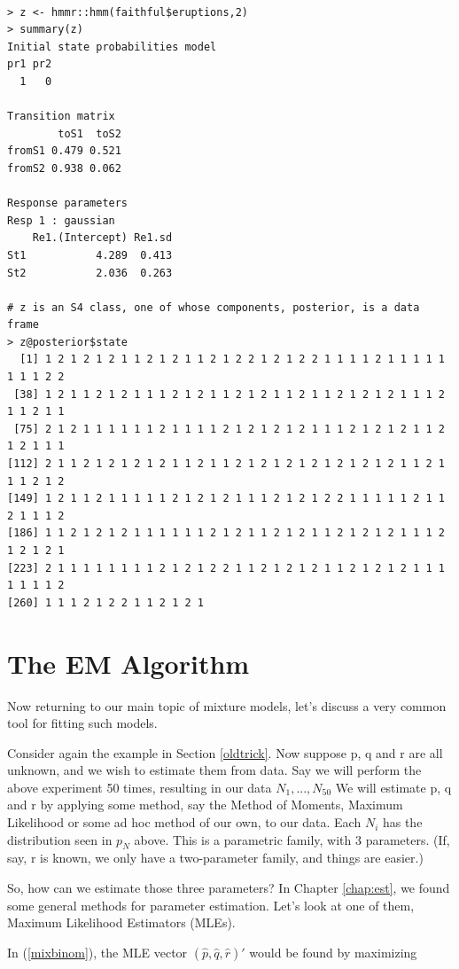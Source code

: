 \documentclass[11pt]{article}
\begin{document}
\begin{lstlisting}

> z <- hmmr::hmm(faithful$eruptions,2)
> summary(z)
Initial state probabilities model 
pr1 pr2 
  1   0 

Transition matrix 
        toS1  toS2
fromS1 0.479 0.521
fromS2 0.938 0.062

Response parameters 
Resp 1 : gaussian 
    Re1.(Intercept) Re1.sd
St1           4.289  0.413
St2           2.036  0.263

# z is an S4 class, one of whose components, posterior, is a data frame
> z@posterior$state
  [1] 1 2 1 2 1 2 1 1 2 1 2 1 1 2 1 2 2 1 2 1 2 2 1 1 1 1 2 1 1 1 1 1 1 1 1 2 2
 [38] 1 2 1 1 2 1 2 1 1 1 2 1 2 1 1 2 1 2 1 1 2 1 1 2 1 2 1 2 1 1 1 2 1 1 2 1 1
 [75] 2 1 2 1 1 1 1 1 1 2 1 1 1 1 2 1 2 1 2 1 2 1 1 1 2 1 2 1 2 1 1 2 1 2 1 1 1
[112] 2 1 1 2 1 2 1 2 1 2 1 1 2 1 1 2 1 2 1 2 1 2 1 2 1 2 1 2 1 1 2 1 1 1 2 1 2
[149] 1 2 1 1 2 1 1 1 1 1 2 1 2 1 2 1 1 1 2 1 2 1 2 2 1 1 1 1 1 2 1 1 2 1 1 1 2
[186] 1 1 2 1 2 1 2 1 1 1 1 1 1 2 1 2 1 1 2 1 2 1 1 2 1 2 1 2 1 1 1 2 1 2 1 2 1
[223] 2 1 1 1 1 1 1 1 1 2 1 2 1 2 2 1 1 2 1 2 1 2 1 1 2 1 2 1 2 1 1 1 1 1 1 1 2
[260] 1 1 1 2 1 2 2 1 1 2 1 2 1

\end{lstlisting}

\section{The EM Algorithm} 
\label{emalg}

Now returning to our main topic of mixture models, let's discuss a very
common tool for fitting such models.

Consider again the example in Section \ref{oldtrick}.  Now suppose p, q
and r are all unknown, and we wish to estimate them from data. Say we
will perform the above experiment 50 times, resulting in our data
$N_1,...,N_{50}$ We will estimate p, q and r by applying some method,
say the Method of Moments, Maximum Likelihood or some ad hoc method of
our own, to our data. Each $N_i$ has the distribution seen in $p_N$
above. This is a parametric family, with 3 parameters. (If, say, r is
known, we only have a two-parameter family, and things are easier.)

So, how can we estimate those three parameters?  In Chapter
\ref{chap:est}, we found some general methods for parameter estimation.
Let's look at one of them, Maximum Likelihood Estimators (MLEs).

In (\ref{mixbinom}), the MLE vector 
$(\widehat{p},
  \widehat{q},
  \widehat{r})'$
would be found by maximizing
\end{document}
